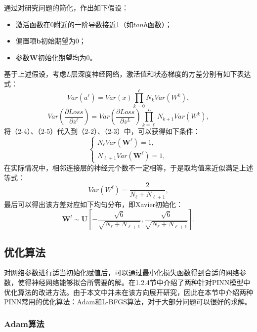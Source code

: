 通过对研究问题的简化，作出如下假设：
\begin{itemize}
    \item 激活函数在0附近的一阶导数接近1（如$tanh$函数）；
    \item 偏置项$\boldsymbol{b}$初始期望为0；
    \item 参数$\boldsymbol{W}$初始化期望均为0。
\end{itemize}
基于上述假设，考虑$L$层深度神经网络，激活值和状态梯度的方差分别有如下表达式：
\begin{equation}Var(a^{\ell})=Var(x)\prod_{k=0}^{\ell} N_{k}Var(W^k),\end{equation}
\begin{equation}Var(\frac{\partial Loss}{\partial z^{\ell}})=Var(\frac{\partial Loss}{\partial z^L})\prod_{k=\ell}^L N_{k+1}Var(W^k),\end{equation}
将（2-4）、（2-5）代入到（2-2）、（2-3）中，可以获得如下条件：
\begin{equation}\left.\left\{\begin{array}{l}N_\ell Var(\boldsymbol{W}^\ell)=1,\\N_{\ell+1}Var(\boldsymbol{W}^\ell)=1,\end{array}\right.\right.\end{equation}
在实际情况中，相邻连接层的神经元个数不一定相等，于是取均值来近似满足上述等式：
\begin{equation}Var(W^\ell)=\frac2{N_\ell+N_{\ell+1}},\end{equation}
最后可以得出该方差对应如下均匀分布，即Xavier初始化：
\begin{equation}\boldsymbol{W}^l\sim\boldsymbol{U}\left[-\frac{\sqrt{6}}{\sqrt{N_\ell+N_{\ell+1}}},\frac{\sqrt{6}}{\sqrt{N_\ell+N_{\ell+1}}}\right].\end{equation}

\subsection{优化算法}

对网络参数进行适当初始化赋值后，可以通过最小化损失函数得到合适的网络参数，使得神经网络能够拟合所需要的解。在1.2.4节中介绍了两种针对PINN模型中优化算法的改进方法。由于本文中并未在该方向展开研究，因此在本节中介绍两种PINN常用的优化算法：Adam和L-BFGS算法，对于大部分问题可以很好的求解。

\subsubsection{Adam算法}


